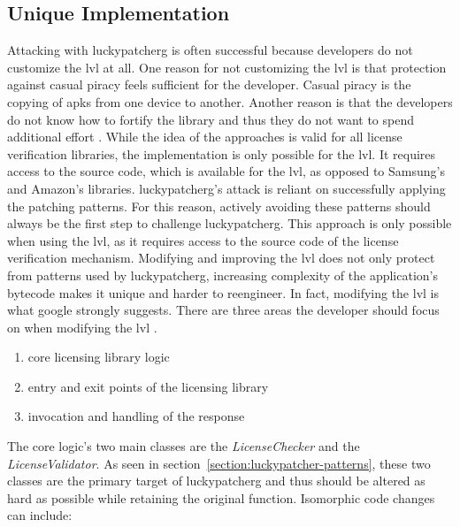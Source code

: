 \subsection{Unique Implementation} \label{subsection:counter-modifications-library}
Attacking with \gls{luckypatcherg} is often successful because developers do not customize the \gls{lvl} at all.
One reason for not customizing the \gls{lvl} is that protection against casual piracy feels sufficient for the developer.
Casual piracy is the copying of \gls{apk}s from one device to another.
\newline
Another reason is that the developers do not know how to fortify the library and thus they do not want to spend additional effort \cite{developersSecuring}.
\newline
While the idea of the approaches is valid for all license verification libraries, the implementation is only possible for the \gls{lvl}.
It requires access to the source code, which is available for the \gls{lvl}, as opposed to Samsung's and Amazon's libraries.
\newline
\gls{luckypatcherg}'s attack is reliant on successfully applying the patching patterns.
For this reason, actively avoiding these patterns should always be the first step to challenge \gls{luckypatcherg}.
This approach is only possible when using the \gls{lvl}, as it requires access to the source code of the license verification mechanism.
Modifying and improving the \gls{lvl} does not only protect from patterns used by \gls{luckypatcherg}, increasing complexity of the application's bytecode makes it unique and harder to reengineer.
In fact, modifying the lvl is what google strongly suggests. \cite{developersSecuring}
\newline
There are three areas the developer should focus on when modifying the \gls{lvl}  \cite{developersSecuring}.
\begin{enumerate}
\item core licensing library logic
\item entry and exit points of the licensing library
\item invocation and handling of the response
\end{enumerate}
The core logic’s two main classes are the \textit{LicenseChecker} and the \textit{LicenseValidator}.
As seen in section~\ref{section:luckypatcher-patterns}, these two classes are the primary target of \gls{luckypatcherg} and thus should be altered as hard as possible while retaining the original function.
Isomorphic code changes can include:
